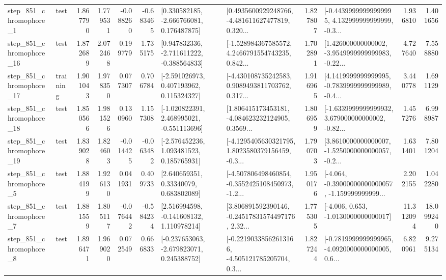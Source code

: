 \begin{tabular}{llrrrrllrlrr}
   step\_851\_chromophore\_1 &      test &      1.867790 &    1.779531 &     -0.088260 & -0.683465 &    [0.330582185, -2.666766081, 0.176487875] &  [0.4935600929248766, -4.481611627477819, 0.320... &       1.827807 &  [-0.44399999999999995, 4.132999999999999, -0.3... &            1.936810 &          1.401656 \\
  step\_851\_chromophore\_16 &      test &      1.872689 &    2.072468 &      0.199779 &  1.735175 &   [0.947832336, -2.711611222, -0.388564833] &  [-1.528984367585572, 4.2466791554743235, 0.842... &       1.702891 &  [1.426000000000002, -3.9549999999999983, -0.22... &            4.727640 &          7.558880 \\
  step\_851\_chromophore\_17 &  training &      1.901043 &    1.978350 &      0.077307 &  0.706784 &    [-2.591026973, 0.407193962, 0.115324327] &  [-4.430108735242583, 0.9089493811703762, 0.317... &       1.916965 &  [4.1419999999999995, -0.7839999999999989, -0.4... &            3.440778 &          1.691129 \\
  step\_851\_chromophore\_18 &      test &      1.850566 &    1.981526 &      0.130960 &  1.157308 &   [-1.020822391, 2.468995021, -0.551113696] &  [1.806415173453181, -4.084623232124905, 0.3569... &       1.806959 &  [-1.6339999999999932, 3.679000000000002, -0.82... &            1.457276 &          6.998987 \\
  step\_851\_chromophore\_19 &      test &      1.839028 &    1.824603 &     -0.014425 & -0.063482 &    [-2.576452236, 1.093481523, 0.185765931] &  [-4.1295405630321795, 1.8023580379156459, -0.3... &       1.790703 &  [3.8610000000000007, -1.5250000000000057, -0.2... &            1.631401 &          7.801204 \\
   step\_851\_chromophore\_5 &      test &      1.884199 &    1.926130 &      0.041931 &  0.409733 &      [2.640659351, 0.33340079, 0.683802089] &  [-4.507806498460854, -0.3552425108450973, -1.2... &       1.950176 &  [-4.064, -0.39000000000000057, -1.159999999999... &            2.202155 &          1.042280 \\
   step\_851\_chromophore\_7 &      test &      1.881559 &    1.805117 &     -0.076442 & -0.584234 &    [2.516994598, -0.141608132, 1.110978214] &  [3.806891592390146, -0.24517831574497176, 2.32... &       1.775305 &               [-4.006, 0.653, -1.0130000000000017] &           11.312094 &         18.099240 \\
   step\_851\_chromophore\_8 &      test &      1.896471 &    1.969020 &      0.072549 &  0.666833 &   [-0.237653063, -2.679823071, 0.245388752] &  [-0.22190338562613166, -4.505121785205704, 0.3... &       1.827244 &  [-0.7819999999999965, -4.0920000000000005, 0.6... &            6.820961 &          9.275134 \\

\end{tabular}
